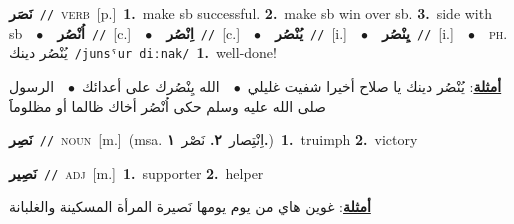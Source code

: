 \documentclass[10pt,a4paper,twoside]{article} %
\begin{document}
\begin{multicols}{2}
{\setlength\topsep{0pt}\textbf{\foreignlanguage{arabic}{نَصَر}}\ {\color{gray}\texttt{//}\color{black}}\ \textsc{verb}\ [p.]\ \textbf{1.}~make sb successful.  \textbf{2.}~make sb win over sb.  \textbf{3.}~side with sb\ \ $\bullet$\ \ \setlength\topsep{0pt}\textbf{\foreignlanguage{arabic}{اُنْصُر}}\ {\color{gray}\texttt{//}\color{black}}\ [c.]\ \ $\bullet$\ \ \setlength\topsep{0pt}\textbf{\foreignlanguage{arabic}{اِنْصُر}}\ {\color{gray}\texttt{//}\color{black}}\ [c.]\ \ $\bullet$\ \ \setlength\topsep{0pt}\textbf{\foreignlanguage{arabic}{يُنْصُر}}\ {\color{gray}\texttt{//}\color{black}}\ [i.]\ \ $\bullet$\ \ \setlength\topsep{0pt}\textbf{\foreignlanguage{arabic}{يِنْصُر}}\ {\color{gray}\texttt{//}\color{black}}\ [i.]\ \ $\bullet$\ \ \textsc{ph.} \color{gray} \foreignlanguage{arabic}{يُنْصُر دينك}\color{black}\ {\color{gray}\texttt{/{\sffamily junsˤur diːnak}/}\color{black}}\ \textbf{1.}~well-done!\  \begin{flushright}\color{gray}\foreignlanguage{arabic}{\textbf{\underline{\foreignlanguage{arabic}{أمثلة}}}: يُنْصُر دينك يا صلاح أخيرا شفيت غليلي\ $\bullet$\ \  الله يِنْصُرك على أعدائك\ $\bullet$\ \  الرسول صلى الله عليه وسلم حكى اُنْصُر أخاك ظالما أو مظلوماََ}\end{flushright}\color{black}} \vspace{2mm}

{\setlength\topsep{0pt}\textbf{\foreignlanguage{arabic}{نَصِر}}\ {\color{gray}\texttt{//}\color{black}}\ \textsc{noun}\ [m.]\ \color{gray}(msa. \foreignlanguage{arabic}{اِنْتِصار}~\foreignlanguage{arabic}{\textbf{٢.}}  \foreignlanguage{arabic}{نَصْر}~\foreignlanguage{arabic}{\textbf{١.}})\color{black}\ \textbf{1.}~truimph  \textbf{2.}~victory\ } \vspace{2mm}

{\setlength\topsep{0pt}\textbf{\foreignlanguage{arabic}{نَصِير}}\ {\color{gray}\texttt{//}\color{black}}\ \textsc{adj}\ [m.]\ \textbf{1.}~supporter  \textbf{2.}~helper\  \begin{flushright}\color{gray}\foreignlanguage{arabic}{\textbf{\underline{\foreignlanguage{arabic}{أمثلة}}}: غوين هاي من يوم يومها نَصيرة المرأة المسكينة والغلبانة}\end{flushright}\color{black}} \vspace{2mm}


\end{multicols}
\end{document}
